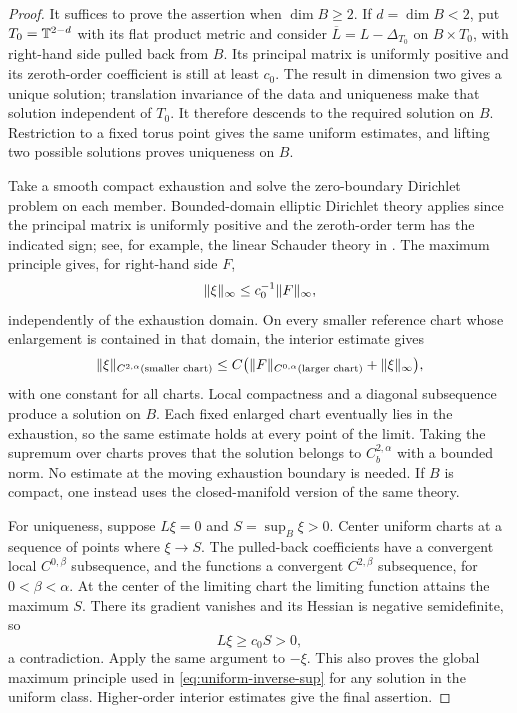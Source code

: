 \begin{proof}
It suffices to prove the assertion when $\dim B\ge2$. If $d=\dim B<2$,
put $T_0=\mathbb T^{2-d}$ with its flat product metric and consider
$\overline L=L-\Delta_{T_0}$ on $B\times T_0$, with right-hand side
pulled back from $B$. Its principal matrix is uniformly positive and its
zeroth-order coefficient is still at least $c_0$. The result in dimension
two gives a unique solution; translation invariance of the data and
uniqueness make that solution independent of $T_0$. It therefore descends
to the required solution on $B$. Restriction to a fixed torus point gives
the same uniform estimates, and lifting two possible solutions proves
uniqueness on $B$.

Take a smooth compact exhaustion and solve the zero-boundary Dirichlet problem on each member. Bounded-domain elliptic Dirichlet theory applies since the principal matrix is uniformly positive and the zeroth-order term has the indicated sign; see, for example, the linear Schauder theory in \cite[Theorems~6.2 and~6.14]{GilbargTrudinger2001}. The maximum principle gives, for right-hand side $F$,
\begin{equation}\label{eq:uniform-inverse-sup}
 \lVert\xi\rVert_{\infty}\le c_0^{-1}\lVert F\rVert_{\infty},
\end{equation}
independently of the exhaustion domain. On every smaller reference chart whose enlargement is contained in that domain, the interior estimate gives
\[
 \lVert\xi\rVert_{C^{2,\alpha}(\text{smaller chart})}
 \le C\bigl(\lVert F\rVert_{C^{0,\alpha}(\text{larger chart})}
                         +\lVert\xi\rVert_{\infty}\bigr),
\]
with one constant for all charts. Local compactness and a diagonal subsequence produce a solution on $B$. Each fixed enlarged chart eventually lies in the exhaustion, so the same estimate holds at every point of the limit. Taking the supremum over charts proves that the solution belongs to $C_b^{2,\alpha}$ with a bounded norm. No estimate at the moving exhaustion boundary is needed. If $B$ is compact, one instead uses the closed-manifold version of the same theory.

For uniqueness, suppose $L\xi=0$ and $S=\sup_B\xi>0$. Center uniform charts at a sequence of points where $\xi\to S$. The pulled-back coefficients have a convergent local $C^{0,\beta}$ subsequence, and the functions a convergent $C^{2,\beta}$ subsequence, for $0<\beta<\alpha$. At the center of the limiting chart the limiting function attains the maximum $S$. There its gradient vanishes and its Hessian is negative semidefinite, so
\[
 L\xi\ge c_0S>0,
\]
a contradiction. Apply the same argument to $-\xi$. This also proves the global maximum principle used in \eqref{eq:uniform-inverse-sup} for any solution in the uniform class. Higher-order interior estimates give the final assertion.
\end{proof}

